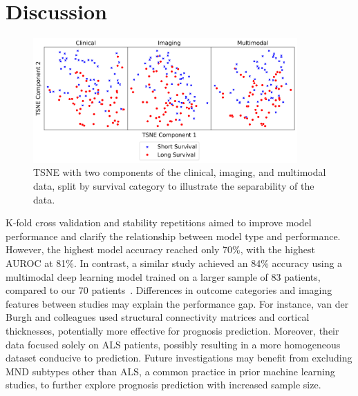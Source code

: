 \section{Discussion}

\begin{figure}
    \centering
    \includegraphics[width=0.9\textwidth]{figures/tsne_plot}
    \caption{TSNE with two components of the clinical, imaging, and multimodal data, split by survival category to illustrate the separability of the data.}
    \label{fig:tsne}
\end{figure}

K-fold cross validation and stability repetitions aimed to improve model performance and clarify the relationship between model type and performance.
However, the highest model accuracy reached only 70\%, with the highest AUROC at 81\%.
In contrast, a similar study achieved an 84\% accuracy using a multimodal deep learning model trained on a larger sample of 83 patients, compared to our 70 patients~\cite{vanderburghDeepLearningPredictions2017}.
Differences in outcome categories and imaging features between studies may explain the performance gap.
For instance, van der Burgh and colleagues used structural connectivity matrices and cortical thicknesses, potentially more effective for prognosis prediction.
Moreover, their data focused solely on ALS patients, possibly resulting in a more homogeneous dataset conducive to prediction.
Future investigations may benefit from excluding MND subtypes other than ALS, a common practice in prior machine learning studies, to further explore prognosis prediction with increased sample size.


